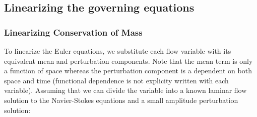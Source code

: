 
\subsection{Linearizing the governing equations}
\subsubsection{Linearizing Conservation of Mass}
To linearize the Euler equations, we substitute each flow variable with its equivalent mean and perturbation components. Note that the mean term is only a function of space whereas the perturbation component is a dependent on both space and time (functional dependence is not explicity written with each variable). Assuming that we can divide the variable into a known laminar flow solution to the Navier-Stokes equations and a small amplitude perturbation solution:

